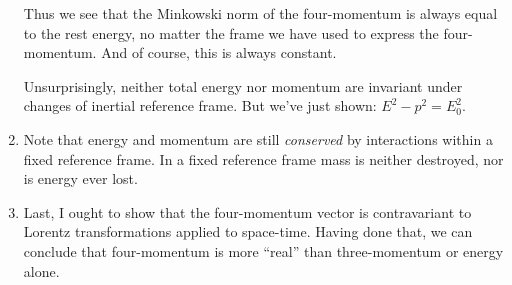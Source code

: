 \begin{enumerate}
  Thus we see that the Minkowski norm of the four-momentum is always
  equal to the rest energy, no matter the frame we have used to express
  the four-momentum. And of course, this is always constant.

  Unsurprisingly, neither total energy nor momentum are invariant under
  changes of inertial reference frame. But we've just shown: $E^2 - p^2
  = E_0^2$.

  \item Note that energy and momentum are still \emph{conserved} by
  interactions within a fixed reference frame. In a fixed reference
  frame mass is neither destroyed, nor is energy ever lost.

  \item Last, I ought to show that the four-momentum vector is
  contravariant to Lorentz transformations applied to space-time. Having
  done that, we can conclude that four-momentum is more ``real'' than
  three-momentum or energy alone.

\end{enumerate}
